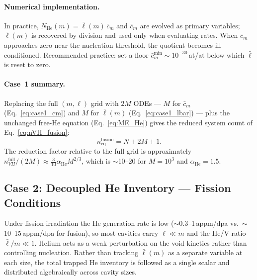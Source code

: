 \paragraph{Numerical implementation.}
In practice, $N_{\mathrm{He}}(m) = \bar{\ell}(m)\,\bar{c}_m$ and
$\bar{c}_m$ are evolved as primary variables; $\bar{\ell}(m)$ is
recovered by division and used only when evaluating rates. When
$\bar{c}_m$ approaches zero near the nucleation threshold, the quotient
becomes ill-conditioned. Recommended practice: set a floor
$\bar{c}_m^{\min} \sim 10^{-30}$\,at/at below which $\bar{\ell}$ is
reset to zero.

\paragraph{Case~1 summary.}
Replacing the full $(m,\ell)$ grid with $2M$ ODEs --- $M$ for
$\bar{c}_m$ (Eq.~\ref{eq:case1_cm}) and $M$ for $\bar{\ell}(m)$
(Eq.~\ref{eq:case1_lbar}) --- plus the unchanged free-He equation
(Eq.~\ref{eq:ME_He}) gives the reduced system count of
Eq.~\eqref{eq:nVH_fusion}:
\begin{equation*}
    n_{\mathrm{eq}}^{\mathrm{fusion}} = N + 2M + 1.
\end{equation*}
The reduction factor relative to the full grid is approximately
$n_{VH}^{\mathrm{full}} / (2M) \approx \tfrac{3}{10}\alpha_{\mathrm{He}}
M^{2/3}$, which is $\sim$10--20 for $M = 10^3$ and
$\alpha_{\mathrm{He}} = 1.5$.

\subsection{Case 2: Decoupled He Inventory --- Fission Conditions}
\label{sec:case2}

Under fission irradiation the He generation rate is low
($\sim$0.3--1\,appm/dpa vs.\ $\sim$10--15\,appm/dpa for fusion), so
most cavities carry $\ell \ll m$ and the He/V ratio $\bar{\ell}/m \ll 1$.
Helium acts as a weak perturbation on the void kinetics rather than
controlling nucleation. Rather than tracking $\bar{\ell}(m)$ as a
separate variable at each size, the total trapped He inventory is
followed as a single scalar and distributed algebraically across cavity
sizes.

